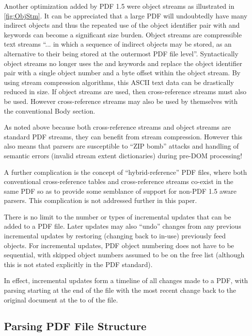 Another optimization added by PDF 1.5 were object streams as illustrated in \cref{fig:ObjStm}.
It can be appreciated that a large PDF will
undoubtedly have many indirect objects and thus the repeated use of the object identifier pair with 
 and  keywords can become a significant size burden. Object streams are
compressible text streams ``... in which a sequence of indirect objects may be stored, as an 
alternative to their being stored at the outermost PDF file level''. 
Syntactically object streams no longer uses the  and  keywords and replace 
the object identifier pair with a single object number and a byte offset within the object stream. 
By using stream compression algorithms, this ASCII text data can be drastically reduced in size.
If object streams are used, then cross-reference streams must also be used. However cross-reference 
streams may also be used by themselves with the conventional Body section.

As noted above because both cross-reference streams and object streams are standard PDF streams, they 
can benefit from stream compression. However this also means that parsers are   
susceptible to ``ZIP bomb''  attacks and handling of semantic errors (invalid stream extent dictionaries) 
during pre-DOM processing!

A further complication is the concept of ``hybrid-reference'' PDF files, where both conventional cross-reference tables and cross-reference streams co-exist in the same PDF so as to provide some semblance of support for non-PDF 1.5 aware parsers. This complication is not addressed further in this paper.

There is no limit to the number or types of incremental updates that can be added to a PDF file. Later
updates may also ``undo'' changes from any previous incremental updates by restoring (changing back to in-use)
previously feed objects. For incremental updates, PDF object numbering 
does not have to be sequential, with skipped object numbers assumed to be on
the free list (although this is not stated explicitly in the PDF standard).

In effect, incremental updates form a timeline of all changes made to a PDF, with parsing starting
at the end of the file with the most recent change back to the original document at the to of the file.

\subsection{Parsing PDF File Structure}
\label{sec:parsingfile}

